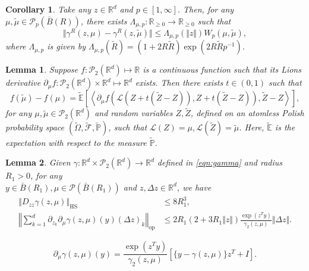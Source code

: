 \documentclass[10pt,a4paper]{amsart}
\newtheorem{corollary}{Corollary}
\newtheorem{lemma}{Lemma}
\newcommand{\E}{\mathbb{E}}
\newcommand{\R}{\mathbb{R}}
\begin{document}
\begin{corollary}\label{corr:LipMu} 
Take any $z \in \mathbb{R}^d$ and $p\in [1,\infty]$. Then, for any $\mu,\tilde{\mu}\in \mathcal{P}_p(\bar B(R))$, there exists $\Lambda_{\mu,p}: \mathbb R_{\ge0}\to \mathbb R_{\ge 0}$  such that
    \[ \Vert \gamma^R(z,\mu)-\gamma^R(z,\tilde{\mu})\Vert \le \Lambda_{\mu,p}(\Vert z \Vert) W_p(\mu, \tilde{\mu}), \]
    where $\Lambda_{\mu,p}$ is given by
$
\Lambda_{\mu,p}(\tilde R) =(1+2R\tilde R)\exp(2R\tilde Rp^{-1})
$.
\end{corollary}

\begin{lemma}\label{ProbMeasureMVT}
    Suppose $f:\mathcal{P}_2(\mathbb{R}^d) \mapsto \mathbb{R}$ is a continuous function such that its Lions derivative $\partial_{\mu}f: \mathcal{P}_2(\mathbb{R}^d)\times \mathbb{R}^d \mapsto \mathbb{R}^d$ exists. Then there exists $t\in (0,1)$ such that 
    \[
    f(\tilde\mu)-f(\mu) = \widetilde{\mathbb{E}}\left[\left\langle\partial_{\mu}f\left(\mathcal{L}(Z + t(\tilde{Z}-Z)),Z + t(\tilde{Z}-Z)\right),\tilde{Z}-Z\right\rangle\right],
    \]
    for any $\mu,\tilde{\mu}\in \mathcal{P}_2(\mathbb{R}^d)$ and random variables $Z,\tilde{Z}$, defined on an atomless Polish probability space $(\widetilde{\Omega}, \widetilde{\mathcal{F}},\widetilde{\mathbb{P}})$, such that $\mathcal{L}(Z)=\mu,\mathcal{L}(\tilde{Z})=\tilde{\mu}$. Here, $\widetilde{\E}$ is the expectation with respect to the measure $\widetilde{\mathbb P}$.
\end{lemma}

\begin{lemma}\label{lemma:2ndderivatives}
Given $\gamma: \R^d\times \mathcal P_2(\R^d)\to \R^d$ defined in \eqref{eqn:gamma} and radius $R_1>0$, for any\\ $y\in \bar B(R_1), \mu \in\mathcal P(\bar B(R_1))$ and $z,\Delta z\in \R^d$, we have
    \begin{align*}
                \left\Vert D_{zz}\gamma(z,\mu)\right\Vert_{\mathrm{HS}} &\le 8 R_1^3, \\ 
        \left\Vert \sum_{k=1}^d\partial_{z_k}\partial_\mu\gamma(z,\mu)(y)(\Delta z)_k\right\Vert_\mathrm{op}&\le 2R_1(2+3R_1\Vert z\Vert)\frac{\exp(z^Ty)}{\gamma_2(z,\mu)}\Vert \Delta z \Vert.
    \end{align*}
\end{lemma}

 \begin{equation}\label{eqn:Dmugamma}
               \partial_\mu \gamma(z,\mu)(y) = \frac{\exp(z^Ty)}{\gamma_2(z,\mu)}\left[  \{y-\gamma(z,\mu)\} z^T+I\right]. 
 \end{equation}
\end{document}
